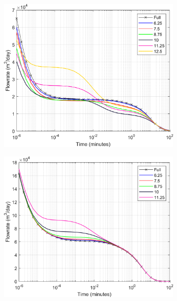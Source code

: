 \documentclass[Supplementary.tex]{subfiles}
\begin{document}
\begin{figure}[ht]
\begin{subfigure}{0.3\textwidth}
        \label{fig:3D_DD_4}
     \end{subfigure}
     \begin{subfigure}{0.3\textwidth}
        \includegraphics[width=\textwidth]{3D_DD/Plot_Drawdown_Case_05_nohead.png}
        \label{fig:3D_DD_5}
     \end{subfigure}
     \begin{subfigure}{0.3\textwidth}
        \includegraphics[width=\textwidth]{3D_DD/Plot_Drawdown_Case_06_nohead.png}

\end{subfigure}
\end{figure}
\end{document}
